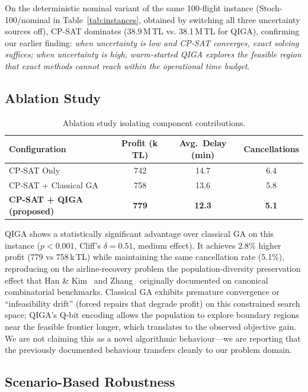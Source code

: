 \documentclass[12pt,number]{elsarticle}
\begin{document}
On the deterministic nominal variant of the same 100-flight instance (Stoch-100/nominal in Table~\ref{tab:instances}, obtained by switching all three uncertainty sources off), CP-SAT dominates (38.9\,M\,TL vs. 38.1\,M\,TL for QIGA), confirming our earlier finding: \emph{when uncertainty is low and CP-SAT converges, exact solving suffices; when uncertainty is high, warm-started QIGA explores the feasible region that exact methods cannot reach within the operational time budget}.

\subsection{Ablation Study}

\begin{table}[H]
\centering
\caption{Ablation study isolating component contributions.}
\label{tab:ablation}
\begin{tabular}{@{}lccc@{}}
\toprule
\textbf{Configuration} & \textbf{Profit (k\,TL)} & \textbf{Avg.\ Delay (min)} & \textbf{Cancellations} \\
\midrule
CP-SAT Only & 742 & 14.7 & 6.4 \\
CP-SAT + Classical GA & 758 & 13.6 & 5.8 \\
\textbf{CP-SAT + QIGA (proposed)} & \textbf{779} & \textbf{12.3} & \textbf{5.1} \\
\bottomrule
\end{tabular}
\end{table}

QIGA shows a statistically significant advantage over classical GA on this instance ($p < 0.001$, Cliff's $\delta = 0.51$, medium effect). It achieves $2.8\%$ higher profit (779 vs 758\,k\,TL) while maintaining the same cancellation rate (5.1\%), reproducing on the airline-recovery problem the population-diversity preservation effect that Han \& Kim~\cite{han2002} and Zhang~\cite{zhang2011} originally documented on canonical combinatorial benchmarks. Classical GA exhibits premature convergence or ``infeasibility drift'' (forced repairs that degrade profit) on this constrained search space; QIGA's Q-bit encoding allows the population to explore boundary regions near the feasible frontier longer, which translates to the observed objective gain. We are not claiming this as a novel algorithmic behaviour---we are reporting that the previously documented behaviour transfers cleanly to our problem domain.

\subsection{Scenario-Based Robustness}
\label{sec:scenarios}
\end{document}
